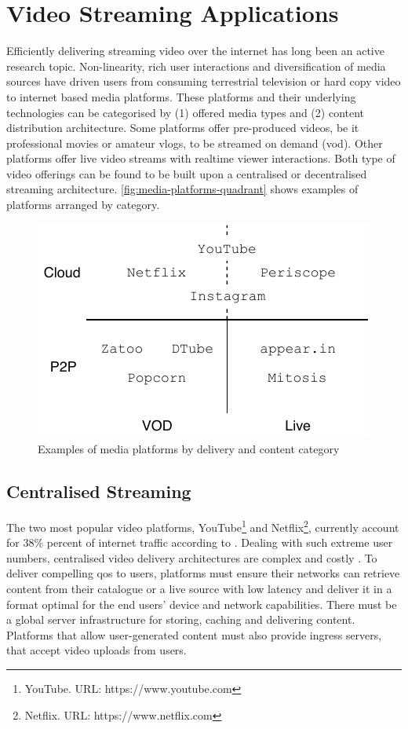\section{Video Streaming Applications}

Efficiently delivering streaming video over the internet has long been an active research topic. Non-linearity, rich user interactions and diversification of media sources have driven users from consuming terrestrial television or hard copy video to internet based media platforms.
These platforms and their underlying technologies can be categorised by (1) offered media types and (2) content distribution architecture. Some platforms offer pre-produced videos, be it professional movies or amateur \glspl{vlog}, to be streamed on demand (\gls{vod}). Other platforms offer live video streams with realtime viewer interactions.
Both type of video offerings can be found to be built upon a centralised or decentralised streaming architecture. \vref{fig:media-platforms-quadrant} shows examples of platforms arranged by category.

\begin{figure}
\centering
\includegraphics[width=.75\textwidth]{graphics/media-platforms-quadrant.pdf}
\caption{Examples of media platforms by delivery and content category}
\label{fig:media-platforms-quadrant}
\end{figure}

\subsection{Centralised Streaming}

The two most popular video platforms, YouTube\footnote{\label{youtube}YouTube. URL: {https://www.youtube.com}} and Netflix\footnote{\label{netflix}Netflix. URL: {https://www.netflix.com}}, currently account for 38\% percent of internet traffic according to \citet[p. 18]{phenomena-report}. Dealing with such extreme user numbers, centralised video delivery architectures are complex and costly \cite{market-driven-p2p}. To deliver compelling \gls{qos} to users, platforms must ensure their networks can retrieve content from their catalogue or a live source with low latency and deliver it in a format optimal for the end users' device and network capabilities. There must be a global server infrastructure for storing, caching and delivering content. Platforms that allow user-generated content must also provide ingress servers, that accept video uploads from users.

